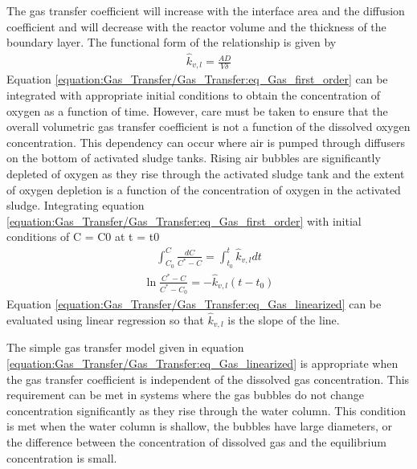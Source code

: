 \documentclass[letterpaper,10pt,english]{sphinxmanual}
\begin{document}
The gas transfer coefficient will increase with the interface area and the diffusion coefficient and will decrease with the reactor volume and the thickness of the boundary layer. The functional form of the relationship is given by
\begin{equation}\label{equation:Gas_Transfer/Gas_Transfer:Gas_Transfer/Gas_Transfer:1}
\begin{split}\hat{k}_{v,l} =\frac{AD}{V\delta }\end{split}
\end{equation}
Equation \eqref{equation:Gas_Transfer/Gas_Transfer:eq_Gas_first_order} can be integrated with appropriate initial conditions to obtain the concentration of oxygen as a function of time. However, care must be taken to ensure that the overall volumetric gas transfer coefficient is not a function of the dissolved oxygen concentration. This dependency can occur where air is pumped through diffusers on the bottom of activated sludge tanks. Rising air bubbles are significantly depleted of oxygen as they rise through the activated sludge tank and the extent of oxygen depletion is a function of the concentration of oxygen in the activated sludge. Integrating equation \eqref{equation:Gas_Transfer/Gas_Transfer:eq_Gas_first_order} with initial conditions of C = C0 at t = t0
\begin{equation}\label{equation:Gas_Transfer/Gas_Transfer:Gas_Transfer/Gas_Transfer:2}
\begin{split}\int _{C_{0} }^{C}\frac{dC}{C^{*} -C}  =\int _{t_{0} }^{t}\hat{k}_{v,l} dt\end{split}
\end{equation}\begin{equation}\label{equation:Gas_Transfer/Gas_Transfer:eq_Gas_linearized}
\begin{split}\ln \frac{C^{*} -C}{C^{*} -C_{0} } =-\hat{k}_{v,l} (t-t_{0} )\end{split}
\end{equation}
Equation \eqref{equation:Gas_Transfer/Gas_Transfer:eq_Gas_linearized} can be evaluated using linear regression so that \(\hat{k}_{v,l}\) is the slope of the line.

The simple gas transfer model given in equation \eqref{equation:Gas_Transfer/Gas_Transfer:eq_Gas_linearized} is appropriate when the gas transfer coefficient is independent of the dissolved gas concentration. This requirement can be met in systems where the gas bubbles do not change concentration significantly as they rise through the water column. This condition is met when the water column is shallow, the bubbles have large diameters, or the difference between the concentration of dissolved gas and the equilibrium concentration is small.
\end{document}
